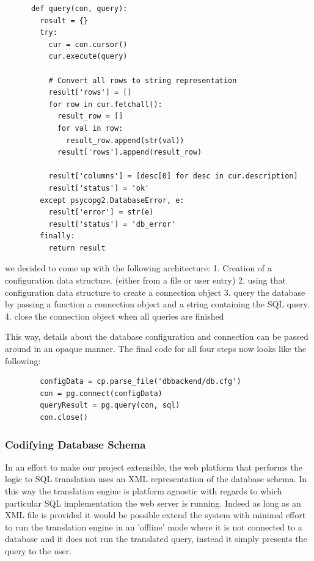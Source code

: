 \documentclass[a4paper, 11pt]{article}
\begin{document}
      \begin{verbatim}
      def query(con, query):
        result = {}
        try:
          cur = con.cursor()
          cur.execute(query)

          # Convert all rows to string representation
          result['rows'] = []
          for row in cur.fetchall():
            result_row = []
            for val in row:
              result_row.append(str(val))
            result['rows'].append(result_row)

          result['columns'] = [desc[0] for desc in cur.description]
          result['status'] = 'ok'
        except psycopg2.DatabaseError, e:
          result['error'] = str(e)
          result['status'] = 'db_error'
        finally:
          return result
      \end{verbatim}

      we decided to come up with the following architecture: 
      1. Creation of a configuration data structure. (either from a file or user
         entry)
      2. using that configuration data structure to create a connection object
      3. query the database by passing a function a connection object and a
      string containing the SQL query.
      4. close the connection object when all queries are finished

      This way, details about the database configuration and connection 
      can be passed around in an opaque manner. The final code for all four
      steps now looks like the following: 

      \begin{verbatim}
        configData = cp.parse_file('dbbackend/db.cfg')
        con = pg.connect(configData)
        queryResult = pg.query(con, sql)
        con.close()
      \end{verbatim}

    \subsubsection{Codifying Database Schema}
      In an effort to make our project extensible, the web platform that performs 
      the logic to SQL translation uses an XML representation of the database
      schema. In this way the translation engine is platform agnostic with
      regards to which particular SQL implementation the web server is running.
      Indeed as long as an XML file is provided it would be possible extend the
      system with minimal effort to run the translation engine in an 'offline' mode 
      where it is not connected to a database and it does not run the translated 
      query, instead it simply presents the query to the user.
\end{document}
